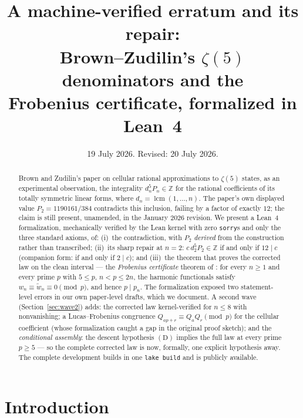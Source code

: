 \documentclass[11pt]{article}
\title{A machine-verified erratum and its repair:\\
Brown--Zudilin's $\zeta(5)$ denominators and the\\
Frobenius certificate, formalized in Lean~4}
\author{}
\date{19 July 2026. Revised: 20 July 2026.}
\theoremstyle{definition}
\DeclareMathOperator{\lcm}{lcm}
\newcommand{\Z}{\mathbb{Z}}
\newcommand{\wtd}{\widetilde}
\newcommand{\lean}[1]{\texttt{#1}}
\begin{document}
\maketitle

\begin{abstract}
Brown and Zudilin's paper on cellular rational approximations to $\zeta(5)$
\cite{BZ22} states, as an experimental observation, the integrality
$d_n^5 P_n \in \Z$ for the rational coefficients of its totally symmetric
linear forms, where $d_n = \lcm(1,\dots,n)$. The paper's own displayed value
$P_2 = 1190161/384$ contradicts this inclusion, failing by a factor of exactly
$12$; the claim is still present, unamended, in the January 2026 revision. We
present a Lean~4 formalization, mechanically verified by the Lean kernel with
zero \lean{sorry}s and only the three standard axioms, of: (i)~the
contradiction, with $P_2$ \emph{derived} from the construction rather than
transcribed; (ii)~its sharp repair at $n = 2$: $c \, d_2^5 P_2 \in \Z$ if and
only if $12 \mid c$ (companion form: if and only if $2 \mid c$); and (iii)~the
theorem that proves the corrected law on the clean interval --- the
\emph{Frobenius certificate} theorem of \cite{CBcert}: for every $n \ge 1$
and every prime $p$ with $5 \le p$, $n < p \le 2n$, the harmonic functionals
satisfy $w_n \equiv \wtd{w}_n \equiv 0 \pmod p$, and hence
$p \mid p_n$. The formalization exposed two statement-level errors in our own
paper-level drafts, which we document. A second wave
(Section~\ref{sec:wave2}) adds: the corrected law kernel-verified for
$n \le 8$ with nonvanishing; a Lucas--Frobenius congruence
$Q_{ap+r} \equiv Q_a Q_r \pmod p$ for the cellular coefficient (whose
formalization caught a gap in the original proof sketch); and the
\emph{conditional assembly}: the descent hypothesis $(\mathrm D)$ implies the
full law at every prime $p \ge 5$ --- so the complete corrected law is now,
formally, one explicit hypothesis away. The complete development builds in
one \lean{lake build} and is publicly available.
\end{abstract}

\section{Introduction}
\end{document}
